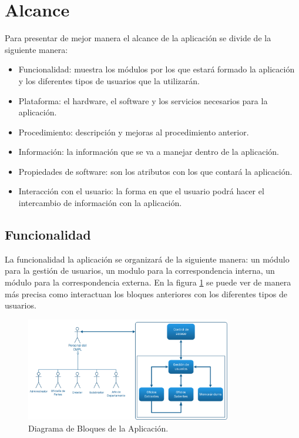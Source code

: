 \section{Alcance}

Para presentar de mejor manera el alcance de la aplicación se divide de la siguiente manera: \\

\begin{itemize}
	\item Funcionalidad: muestra los módulos por los que estará formado la aplicación y los diferentes tipos de usuarios que la utilizarán.
	\item Plataforma: el hardware, el software y los servicios necesarios para la aplicación.
	\item Procedimiento: descripción y mejoras al procedimiento anterior.
	\item Información: la información que se va a manejar dentro de la aplicación.
	\item Propiedades de software: son los atributos con los que contará la aplicación.
	\item Interacción con el usuario: la forma en que el usuario podrá hacer el intercambio de información con la aplicación.
\end{itemize}


\subsection{Funcionalidad}

La funcionalidad la aplicación se organizará de la siguiente manera: un módulo para la gestión de usuarios, un modulo para la correspondencia interna, un módulo para la correspondencia externa. En la figura \ref{diagrama a bloques} se puede ver de manera más precisa como interactuan los bloques anteriores con los diferentes tipos de usuarios.\\

	\begin{figure}[htbp!]
		\centering
			\includegraphics[width=0.8\textwidth]{images/propuesta/diagramabloques}
		\caption{Diagrama de Bloques de la Aplicación.}
		\label{diagrama a bloques}
	\end{figure}

